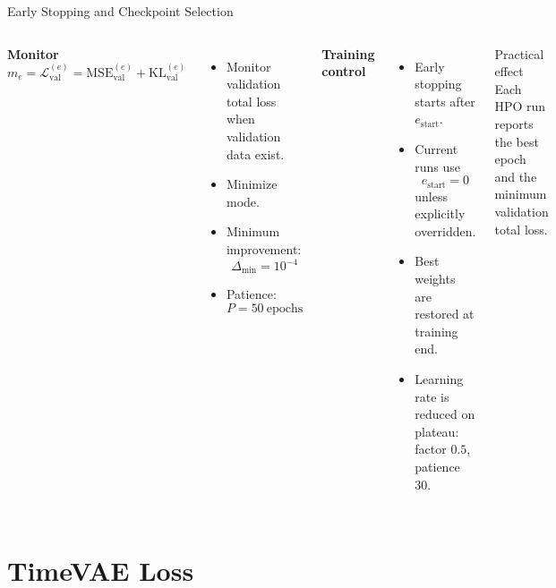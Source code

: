 \documentclass[aspectratio=169,10pt]{beamer}
\begin{document}
\begin{frame}{Early Stopping and Checkpoint Selection}
  \begin{columns}[T]
      \textbf{Monitor}
      \[
        m_e = \mathcal{L}_{\mathrm{val}}^{(e)}
        =
        \mathrm{MSE}_{\mathrm{val}}^{(e)}
        +
        \mathrm{KL}_{\mathrm{val}}^{(e)}
      \]
      \begin{itemize}
        \item Monitor validation total loss when validation data exist.
        \item Minimize mode.
        \item Minimum improvement:
          \[
            \Delta_{\min}=10^{-4}
          \]
        \item Patience:
          \[
            P=50\ \mathrm{epochs}
          \]
      \end{itemize}

      \textbf{Training control}
      \begin{itemize}
        \item Early stopping starts after
          $e_{\mathrm{start}}$.
        \item Current runs use
          \[
            e_{\mathrm{start}}=0
          \]
          unless explicitly overridden.
        \item Best weights are restored at training end.
        \item Learning rate is reduced on plateau:
          factor $0.5$, patience $30$.
      \end{itemize}

      \begin{block}{Practical effect}
        \small
        Each HPO run reports the best epoch and the minimum
        validation total loss.
      \end{block}
  \end{columns}
\end{frame}

\section{TimeVAE Loss}
\end{document}

